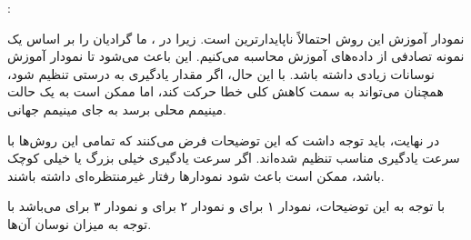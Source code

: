 :

نمودار آموزش این روش احتمالاً ناپایدارترین است. زیرا در
، ما گرادیان را بر اساس یک نمونه تصادفی از داده‌های آموزش محاسبه می‌کنیم. این باعث می‌شود تا نمودار آموزش
نوسانات زیادی داشته باشد. با این حال، اگر مقدار یادگیری به درستی تنظیم شود،
همچنان می‌تواند به سمت کاهش کلی خطا حرکت کند، اما ممکن است به یک حالت مینیمم محلی برسد به جای مینیمم جهانی.

در نهایت، باید توجه داشت که این توضیحات فرض می‌کنند که تمامی این روش‌ها با سرعت یادگیری مناسب تنظیم شده‌اند. اگر سرعت یادگیری خیلی بزرگ یا خیلی کوچک باشد، ممکن است باعث شود نمودارها رفتار غیرمنتظره‌ای داشته باشند.

با توجه به این توضیحات،
نمودار ۱ برای
و نمودار ۲ برای
و نمودار ۳ برای 
می‌باشد با توجه به میزان نوسان آن‌ها.
